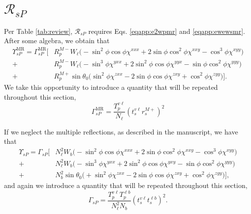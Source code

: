 

\section{\texorpdfstring{$\mathcal{R}_{sP}$}{RsP}}

Per Table \ref{tab:review}, $\mathcal{R}_{sP}$ requires Eqs.
\eqref{eqapp:e2wpmr} and \eqref{eqapp:ewewsmr}. After some algebra, we obtain that
\begin{equation}\label{eqapp:rspfullmr}
\begin{split}
\Upsilon^{\mathrm{MR}}_{sP} =
\Gamma^{\mathrm{MR}}_{sP}
\bigg[
&R^{M-}_{p}W_{\ell}
\big(
-\sin^{2}\phi\cos\phi\chi^{xxx}
+ 2\sin\phi\cos^{2}\phi\chi^{xxy}
- \cos^{3}\phi\chi^{xyy}
\big)\\
+&R^{M-}_{p}W_{\ell}
\big(
- \sin^{3}\phi\chi^{yxx}
+ 2\sin^{2}\phi\cos\phi \chi^{yyx}
- \sin\phi\cos^{2}\phi\chi^{yyy}
\big)\\
+&R^{M+}_{p}\sin\theta_{0}
\big(
\sin^{2}\phi\chi^{zxx}
- 2\sin\phi\cos\phi\chi^{zxy}
+ \cos^{2}\phi\chi^{zyy}
\big)
\bigg].
\end{split}
\end{equation}
We take this opportunity to introduce a quantity that will be repeated
throughout this section,
\begin{equation}\label{eqapp:gammaspmr}
\Gamma^{\mathrm{MR}}_{sP} =
\frac{T^{v\ell}_{p}}{N_{\ell}}
\left(t^{v\ell}_{s}r^{M+}_{s}\right)^{2}
\end{equation}

If we neglect the multiple reflections, as described in the manuscript, we have
that
\begin{equation}\label{eqapp:rspfull}
\begin{split}
\Upsilon_{sP} =
\Gamma_{sP}
\bigg[
&N^{2}_{\ell}W_{b}\big(
- \sin^{2}\phi\cos\phi\chi^{xxx}
+ 2\sin\phi\cos^{2}\phi\chi^{xxy}
- \cos^{3}\phi\chi^{xyy}
  \big)\\
+&N^{2}_{\ell}W_{b}\big(
- \sin^{3}\phi\chi^{yxx}
+ 2\sin^{2}\phi\cos\phi\chi^{yxy}
- \sin\phi\cos^{2}\phi\chi^{yyy}
  \big)\\
+&N^{2}_{b}\sin\theta_{0}\big(
+ \sin^{2}\phi\chi^{zxx}
- 2\sin\phi\cos\phi\chi^{zxy}
+ \cos^{2}\phi\chi^{zyy}
  \big)
\bigg],
\end{split}
\end{equation}
and again we introduce a quantity that will be repeated throughout this section,
\begin{equation}\label{eqapp:gammasp}
\Gamma_{sP} =
\frac{T^{v\ell}_{p}T^{\ell b}_{p}}{N^{2}_{\ell}N_{b}}
\left(t^{v\ell}_{s}t^{\ell b}_{s}\right)^{2}.
\end{equation}


